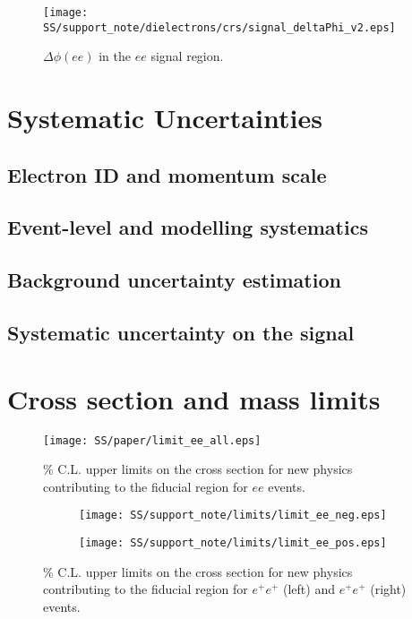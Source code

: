 \begin{figure}[h]
\begin{center}
\texttt{[image: SS/support\_note/dielectrons/crs/signal\_deltaPhi\_v2.eps]}
\caption{\toDo $\Delta\phi(ee)$ in the $ee$ signal region.}
\label{fig:delta_phi}
\end{center}
\end{figure}



\section{Systematic Uncertainties}
\label{sec:ss_Systematics}
\subsection{Electron ID and momentum scale}
\subsection{Event-level and modelling systematics}
\subsection{Background uncertainty estimation}
\subsection{Systematic uncertainty on the signal}

\section{Cross section and mass limits}

\begin{figure}[h]
\begin{center}
\texttt{[image: SS/paper/limit\_ee\_all.eps]}
\caption{\% C.L. upper limits on the cross section for new physics contributing to the fiducial region for $ee$ events.}
\label{fig:signal_mass}
\end{center}
\end{figure}


\begin{figure}
\begin{subfigure}{.5\textwidth}
  \centering
  \texttt{[image: SS/support\_note/limits/limit\_ee\_neg.eps]}
\end{subfigure}%
\begin{subfigure}{.5\textwidth}
  \centering
  \texttt{[image: SS/support\_note/limits/limit\_ee\_pos.eps]}
\end{subfigure}
\caption{\% C.L. upper limits on the cross section for new physics contributing to the fiducial region 
for $e^{+}e^{+}$ (left) and $e^{+}e^{+}$ (right) events.}
  \label{fig:signal_kinematics}
\end{figure}

